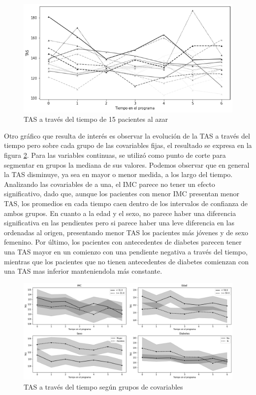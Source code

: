 \documentclass[spanish]{article}
\numberwithin{figure}{subsection}
\numberwithin{equation}{subsection}
\numberwithin{table}{subsection}
\begin{document}
\begin{figure}[H]
	\centering
	\includegraphics[scale=0.5]{img/spaghetti_plot.png}
	\caption{TAS a través del tiempo de 15 pacientes al azar}
	\label{spaghetti}
\end{figure}

Otro gráfico que resulta de interés es observar la evolución de la TAS a través
del tiempo pero sobre cada grupo de las covariables fijas, el resultado se
expresa en la figura \ref{TAS_with_covs}. Para las variables continuas, se
utilizó como punto de corte para segmentar en grupos la mediana de sus valores.
Podemos observar que en general la TAS disminuye, ya sea en mayor o menor
medida, a los largo del tiempo. Analizando las covariables de a una, el IMC
parece no tener un efecto significativo, dado que, aunque los pacientes con
menor IMC presentan menor TAS, los promedios en cada tiempo caen dentro de los
intervalos de confianza de ambos grupos. En cuanto a la edad y el sexo, no
parece haber una diferencia significativa en las pendientes pero si parece haber
una leve diferencia en las ordenadas al origen, presentando menor TAS los
pacientes más jóvenes y de sexo femenino. Por último, los pacientes con
antecedentes de diabetes parecen tener una TAS mayor en un comienzo con una
pendiente negativa a través del tiempo, mientras que los pacientes que no tienen
antecedentes de diabetes comienzan con una TAS mas inferior manteniendola más
constante.

\begin{figure}[H]
	\centering
	\includegraphics[scale=0.4]{img/TAS_vs_tpo_with_covs.png}
	\caption{TAS a través del tiempo según grupos de covariables}
	\label{TAS_with_covs}
\end{figure}
\end{document}
